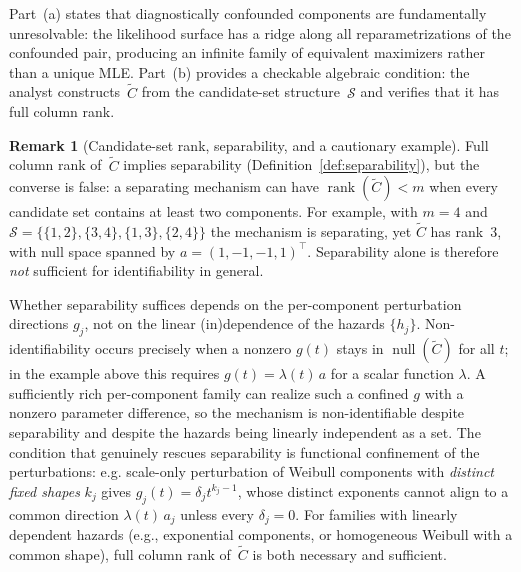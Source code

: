 \documentclass[11pt]{article}
\theoremstyle{definition}
\newtheorem{remark}{Remark}
\theoremstyle{plain}
\begin{document}
Part~(a) states that diagnostically confounded components are
fundamentally unresolvable: the likelihood surface has a ridge along
all reparametrizations of the confounded pair, producing an infinite
family of equivalent maximizers rather than a unique MLE.
Part~(b) provides a checkable algebraic condition: the analyst
constructs~$\tilde{C}$ from the candidate-set
structure~$\mathcal{S}$ and verifies that it has full column rank.

\begin{remark}[Candidate-set rank, separability, and a cautionary example]
\label{rem:linear-independence}
Full column rank of~$\tilde{C}$ implies separability
(Definition~\ref{def:separability}), but the converse is false: a
separating mechanism can have
$\operatorname{rank}(\tilde{C}) < m$ when every candidate set
contains at least two components. For example, with $m = 4$ and
$\mathcal{S} = \{\{1,2\}, \{3,4\}, \{1,3\}, \{2,4\}\}$ the
mechanism is separating, yet $\tilde{C}$ has rank~$3$, with null
space spanned by $a = (1, -1, -1, 1)^\top$. Separability alone is
therefore \emph{not} sufficient for identifiability in general.

Whether separability suffices depends on the per-component
perturbation directions $g_j$, not on the linear (in)dependence of
the hazards $\{h_j\}$. Non-identifiability occurs precisely when a
nonzero $g(t)$ stays in $\operatorname{null}(\tilde{C})$ for all
$t$; in the example above this requires $g(t) = \lambda(t)\,a$ for a
scalar function $\lambda$. A sufficiently rich per-component family
can realize such a confined $g$ with a nonzero parameter difference,
so the mechanism is non-identifiable despite separability and
despite the hazards being linearly independent as a set. The
condition that genuinely rescues separability is functional
confinement of the perturbations: e.g. scale-only perturbation of
Weibull components with \emph{distinct fixed shapes} $k_j$ gives
$g_j(t) = \delta_j t^{k_j-1}$, whose distinct exponents cannot align
to a common direction $\lambda(t)\,a_j$ unless every $\delta_j = 0$.
For families with linearly dependent hazards (e.g., exponential
components, or homogeneous Weibull with a common shape), full column
rank of~$\tilde{C}$ is both necessary and sufficient.
\end{remark}
\end{document}
